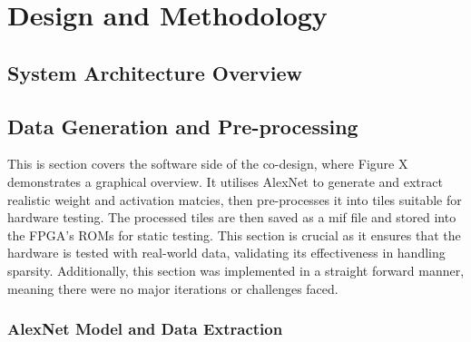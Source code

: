 \documentclass[12pt, a4paper, ukenglish]{article}
\begin{document}

\section{Design and Methodology} \label{sec: design_method}
    \subsection{System Architecture Overview} \label{sec: SA overview}

    \subsection{Data Generation and Pre-processing} \label{sec: data_gen}
    This is section covers the software side of the co-design, where Figure X demonstrates a graphical overview. It utilises AlexNet to generate and extract realistic weight and activation matcies, then pre-processes it into tiles suitable for hardware testing. The processed tiles are then saved as a mif file and stored into the FPGA's ROMs for static testing. This section is crucial as it ensures that the hardware is tested with real-world data, validating its effectiveness in handling sparsity. Additionally, this section was implemented in a straight forward manner, meaning there were no major iterations or challenges faced.

    

        \subsubsection{AlexNet Model and Data Extraction} \label{sec: alexnet}
        
\end{document}
